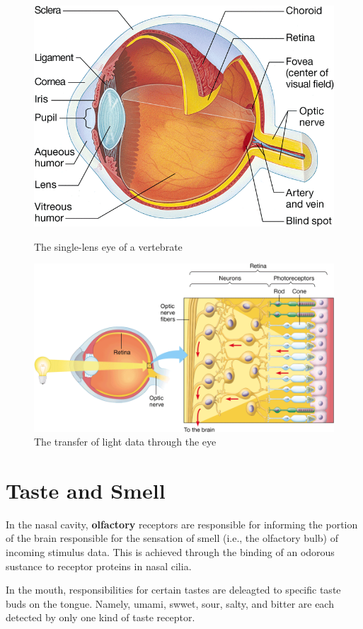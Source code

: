 \documentclass{article}
\begin{document}
\begin{figure}[h]
	\begin{minipage}{.5\textwidth}
		\centering
		\includegraphics[width=0.82\linewidth]{single_lens_eye.png}
		\caption{The single-lens eye of a vertebrate}
	\end{minipage}%
	\begin{minipage}{.5\textwidth}
		\centering
		\includegraphics[width=\linewidth]{single_lens_eye_rods_cones.png}
		\caption{The transfer of light data through the eye}
	\end{minipage}
\end{figure}

\section{Taste and Smell}

In the nasal cavity, \textbf{olfactory} receptors are responsible for informing
the portion of the brain responsible for the sensation of smell (i.e., the
olfactory bulb) of incoming stimulus data. This is achieved through the binding
of an odorous sustance to receptor proteins in nasal cilia.

In the mouth, responsibilities for certain tastes are deleagted to specific
taste buds on the tongue. Namely, umami, swwet, sour, salty, and bitter are each
detected by only one kind of taste receptor.
\end{document}
